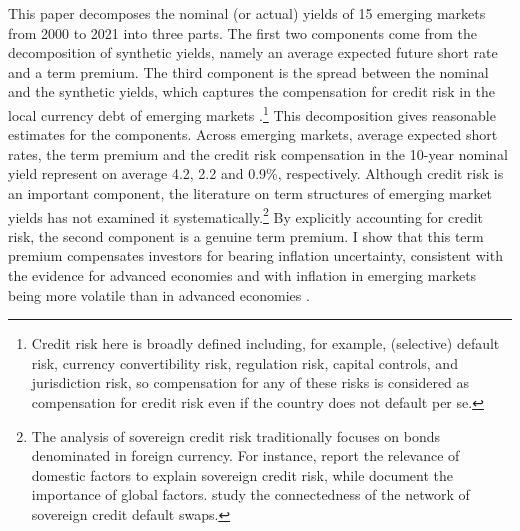 {This paper decomposes the nominal (or actual) yields of 15 emerging markets from 2000 to 2021 %
into three parts. The first two components come from the decomposition of synthetic yields, namely an average expected future short rate and a term premium. The third component is the spread between the nominal and the synthetic yields, which captures the compensation for credit risk in the local currency debt of emerging markets \citep{DuSchreger:2016JoF}.\footnote{ Credit risk here is broadly defined including, for example, (selective) default risk, currency convertibility risk, regulation risk, capital controls, and jurisdiction risk, so compensation for any of these risks is considered as compensation for credit risk even if the country does not default per se.}
This decomposition gives reasonable estimates for the components.
Across emerging markets, average expected short rates, the term premium and the credit risk compensation in the 10-year nominal yield represent on average 4.2, 2.2 and 0.9\%, respectively.
Although credit risk is an important component, %
the literature on term structures of emerging market yields has not examined it systematically.\footnote{ The analysis of sovereign credit risk traditionally focuses on bonds denominated in foreign currency. For instance, \cite{HilscherNosbusch:2010} report the relevance of domestic factors to explain sovereign credit risk, while \cite{Longstaffetal:2011} document the importance of global factors. \cite{BostanciYilmaz:2020} study the connectedness of the network of sovereign credit default swaps.} By explicitly accounting for credit risk, the second component is a genuine term premium. %
I show that this term premium %
compensates investors for bearing inflation uncertainty, consistent with the evidence for advanced economies \citep{Wright:2011} and with inflation in emerging markets being more volatile than in advanced economies \citep{HaKoseOhnsorge:2019}.  

}

